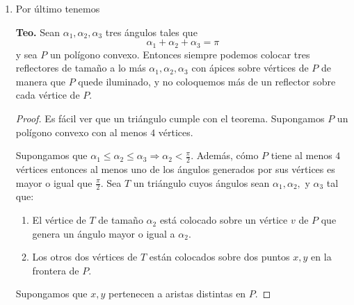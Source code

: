 \begin{enumerate}
  \begin{center}
    \textbf{Lema.} Todo polígono ortogonal con $n$ vértices tine
    $\frac{n - 4}{2}$
    vértices concavos.
    \begin{proof}
      Procedamos por inducción sobre el número de vértices. Es fácil ver que sólo podemos agregar $2m$ vértices
      a la vez, con $m \in \mathbb{Z}$. Supongamos que para $k$ vértices se cumple el lema. ¿Qué pasa con $k + 2$
      vértices?
      \[\frac{k - 4}{2} + 1 = \frac{k - 4 + 2}{2} = \frac{(k + 2) - 4}{2}.\]
    \end{proof}
  \end{center}
  \begin{center}
    \textbf{Def.} Un corte impar es un corte horizontal o vértical, tal que uno de los subpolígonos
    que forma es de tamaño $4k + 2$. Con $k \in \mathbb{Z}$.
  \end{center}
  \begin{center}
    \textbf{Teo.} $\lfloor \frac{n}{4} \rfloor$ lámparas son siempre son siempre suficientes y a veces necesarias
    para iluminar cualquier polígono ortogonal con $n$ vértices.
  \end{center}

\item Por último tenemos

  \begin{center} %
    \textbf{Teo.} Sean $\alpha_1, \alpha_2, \alpha_3$ tres ángulos tales que
    \[\alpha_1 + \alpha_2 + \alpha_3 = \pi\]
    y sea $P$ un polígono convexo. Entonces siempre podemos colocar tres reflectores
    de tamaño a lo más $\alpha_1, \alpha_2, \alpha_3$ con ápices sobre vértices de $P$
    de manera que $P$ quede iluminado, y no coloquemos más de un reflector sobre cada
    vértice de $P$.
  \end{center}
  \begin{proof}
    Es fácil ver que un triángulo cumple con el teorema. Supongamos $P$ un polígono convexo con al menos $4$
    vértices.\newline

    Supongamos que $\alpha_1 \leq \alpha_2 \leq \alpha_3 \Rightarrow \alpha_2 < \frac{\pi}{2}$.  Además, cómo
    $P$ tiene al menos $4$ vértices entonces al menos uno de los ángulos generados por sus vértices es mayor
    o igual que $\frac{\pi}{2}$. Sea $T$ un triángulo cuyos ángulos sean $\alpha_1, \alpha_2,$ y $\alpha_3$
    tal que:
    \begin{enumerate}
    \item El vértice de $T$ de tamaño $\alpha_2$ está colocado sobre un vértice $v$ de $P$ que genera un ángulo
      mayor o igual a $\alpha_2$.
    \item Los otros dos vértices de $T$ están colocados sobre dos puntos $x, y$ en la frontera de $P$.
    \end{enumerate}
    Supongamos que $x,y$ pertenecen a aristas distintas en $P$.\newline
    

\end{proof}
\end{enumerate}
